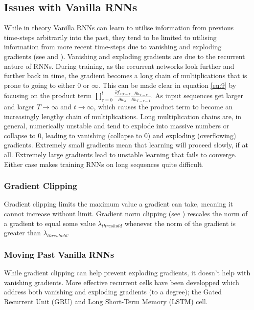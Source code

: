 \documentclass[]{article}
\begin{document}
\subsection{Issues with Vanilla RNNs}
While in theory Vanilla RNNs can learn to utilise information from previous time-steps arbitrarily into the past, they tend to be limited to utilising information from more recent time-steps due to vanishing and exploding gradients (see \cite{298725} and \cite{279181}). 
\newline
\newline
Vanishing and exploding gradients are due to the recurrent nature of RNNs. During training, as the recurrent networks look further and further back in time, the gradient becomes a long chain of multiplications that is prone to going to either $0$ or $\infty$. This can be made clear in equation \ref{eq:9} by focusing on the product term $ \prod_{\tau=0}^{t} \frac{\partial f_{h|T - \tau}}{\partial w_{h}} \frac{\partial h_{T - \tau}}{\partial h_{T - \tau-1}}$. As input sequences get larger and larger $T \rightarrow \infty$ and $t \rightarrow \infty$, which causes the product term to become an increasingly lengthy chain of multiplications. Long multiplication chains are, in general, numerically unstable and tend to explode into massive numbers or collapse to 0, leading to vanishing (collapse to 0) and exploding (overflowing) gradients.
\newline
\newline
Extremely small gradients mean that learning will proceed slowly, if at all. Extremely large gradients lead to unstable learning that fails to converge. Either case makes training RNNs on long sequences quite difficult.
\subsubsection{Gradient Clipping}
Gradient clipping limits the maximum value a gradient can take, meaning it cannot increase without limit. Gradient norm clipping (see \cite{10.5555/3042817.3043083}) rescales the norm of a gradient to equal some value $\lambda_{threshold}$ whenever the norm of the gradient is greater than $\lambda_{threshold}$.
\subsubsection{Moving Past Vanilla RNNs}
While gradient clipping can help prevent exploding gradients, it doesn't help with vanishing gradients. More effective recurrent cells have been developped which address both vanishing and exploding gradients (to a degree); the Gated Recurrent Unit (GRU) and Long Short-Term Memory (LSTM) cell.
\end{document}
